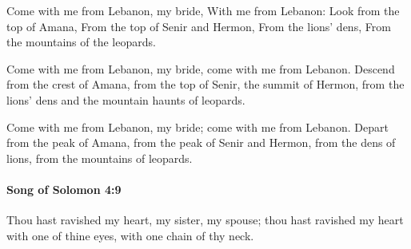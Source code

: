 			\begin{versebox}
					\item[BHS] 
					\item[LXX] 
					\item[ASV] Come with me from Lebanon, my bride, With me from Lebanon: Look from the top of Amana, From the top of Senir and Hermon, From the lions' dens, From the mountains of the leopards.
					\item[NIV] Come with me from Lebanon, my bride, come with me from Lebanon. Descend from the crest of Amana, from the top of Senir, the summit of Hermon, from the lions’ dens and the mountain haunts of leopards.
					\item[NRSV] Come with me from Lebanon, my bride; come with me from Lebanon. Depart from the peak of Amana, from the peak of Senir and Hermon, from the dens of lions, from the mountains of leopards.
			\end{versebox}

		\paragraph{Song of Solomon 4:9} %
			\label{SONGOFSOLOMON-4-9}

			Thou hast ravished my heart, my sister, my spouse; thou hast ravished my heart with one of thine eyes, with one chain of thy neck.

